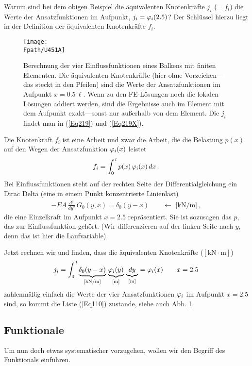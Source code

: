 Warum sind bei dem obigen Beispiel die \"{a}quivalenten Knotenkr\"{a}fte $j_i$ (= $f_i$) die Werte der Ansatzfunktionen im Aufpunkt, $j_i = \varphi_i(2.5)$? Der Schl\"{u}ssel hierzu liegt in der Definition der \"{a}quivalenten Knotenkr\"{a}fte $f_i$.

\begin{figure}[tbp]
\centering
\if {} \sidecaption[t] \fi
\texttt{[image: \\Fpath/U451A]}
\caption{Berechnung der vier Einflussfunktionen eines Balkens mit finiten Elementen. Die \"{a}quivalenten Knotenkr\"{a}fte (hier ohne Vorzeichen---das steckt in den Pfeilen) sind die Werte der Ansatzfunktionen im Aufpunkt $x = 0.5\,\ell$. Wenn zu den FE-L\"{o}sungen noch die lokalen L\"{o}sungen addiert werden, sind die Ergebnisse auch im Element mit dem Aufpunkt exakt---sonst nur au{\ss}erhalb von dem Element. Die $j_i$ findet man in (\ref{Eq219}) und (\ref{Eq219X}). } \label{U451}
\end{figure}%
Die Knotenkraft $f_i$ ist eine Arbeit und zwar die Arbeit, die die Belastung $p(x)$  auf den Wegen der Ansatzfunktion $\varphi_i(x)$ leistet
\begin{align}
f_i = \int_0^{\,l} p(x)\,\varphi_i(x)\,dx\,.
\end{align}
Bei Einflussfunktionen steht auf der rechten Seite der Differentialgleichung ein Dirac Delta (eine in einem Punkt konzentrierte Linienlast)
\begin{align}
-EA\,\frac{d^2}{dy^2}\,G_0(y,x) = \delta_0(y-x) \qquad \leftarrow \,\,\text{[kN/m]}\,,
\end{align}
die eine Einzelkraft im Aufpunkt $x = 2.5$ repr\"{a}sentiert. Sie ist sozusagen das $p$, das zur Einflussfunktion geh\"{o}rt. (Wir differenzieren auf der linken Seite nach $y$, denn das ist hier die Laufvariable).

Jetzt rechnen wir und finden, dass die \"{a}quivalenten Knotenkr\"{a}fte ($[\text{kN} \cdot \text{m}]$)
\begin{align}
j_i = \int_0^{\,l} \underbrace{\delta_0(y-x)}_{[\text{kN/m}]}\,\underbrace{\varphi_i(y)}_{[\text{m}]}\,\underbrace{dy}_{\text{[m]}} = \varphi_i(x)  \qquad x = 2.5
\end{align}
zahlenm\"{a}{\ss}ig einfach die Werte der vier Ansatzfunktionen $\varphi_i$ im Aufpunkt $x = 2.5$ sind, so kommt die Liste (\ref{Eq110}) zustande, siehe auch Abb. \ref{U451}.

{\textcolor{sectionTitleBlue}{\section{Funktionale}}}
Um nun doch etwas systematischer vorzugehen, wollen wir den Begriff des Funktionals einf\"{u}hren.

